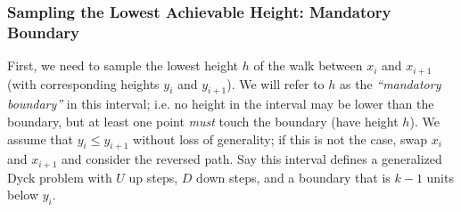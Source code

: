 \subsubsection{Sampling the Lowest Achievable Height: Mandatory Boundary}
\label{sec:sampling_the_lowest_achievable_height}
First, we need to sample the lowest height $h$ of the walk between $x_i$ and $x_{i+1}$ (with corresponding heights $y_i$ and $y_{i+1}$).
We will refer to $h$ as the \emph{``mandatory boundary''} in this interval;
i.e. no height in the interval may be lower than the boundary, but at least one point \emph{must} touch the boundary (have height $h$).
We assume that $y_i\le y_{i+1}$ without loss of generality; if this is not the case, swap $x_i$ and $x_{i+1}$ and consider the reversed path.
Say this interval defines a generalized Dyck problem with $U$ up steps, $D$ down steps, and a boundary that is $k-1$ units below $y_i$.

